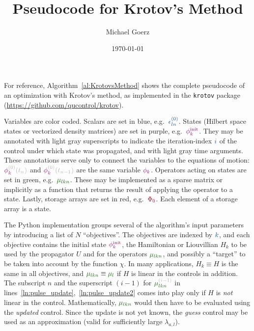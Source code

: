 \documentclass[aps,pra,twocolumn,notitlepage,letterpaper]{revtex4}
\def\Author{Michael Goerz}
\def\Title{Pseudocode for Krotov's Method}
\newcommand{\VarScalar}[1]{{\color{clVarScalar}#1}}
\newcommand{\VarState}[1]{\ensuremath{\textcolor{clVarState}{#1}}}
\newcommand{\PropAnnotation}[1]{\textcolor{black!30}{#1}}
\newcommand{\VarPropState}[4]{\ensuremath{\VarState{#1}_{\textcolor{clVarState}{#2}}^{\PropAnnotation{#3}}\PropAnnotation{(#4)}}}  %
\newcommand{\VarOperator}[2]{{\color{clVarOperator}#1_{#2}}} %
\newcommand{\VarArray}[1]{{\color{clVarArray}#1}}
\begin{document}
\title{\Title}
\author{\Author}
\date{\today}

\maketitle

For reference, Algorithm~\ref{al:KrotovsMethod} shows the complete pseudocode of
an optimization with Krotov's method, as implemented in the
\texttt{krotov} package (\url{https://github.com/qucontrol/krotov}).

Variables are color coded.
Scalars are set in blue, e.g.\ $\VarScalar{\epsilon_{ln}^{(0)}}$.
States  (Hilbert space states or vectorized density matrices) are set in purple,
e.g.\ $\VarState{\phi_k^{\text{init}}}$.
They may be annotated with light gray superscripts to indicate the
iteration-index $\VarScalar{i}$ of the control under which state was propagated,
and with light gray time arguments.
These annotations serve only to connect the variables to the equations of
motion: $\VarPropState{\phi}{k}{(0)}{t_n}$ and
$\VarPropState{\phi}{k}{(0)}{t_{n-1}}$ are the same variable
$\VarState{\phi_k}$.
Operators acting on states are set in green, e.g.\ $\VarOperator{\mu}{lkn}$.
These may be implemented as a sparse matrix or implicitly as a function that
returns the result of applying the operator to a state.
Lastly, storage arrays are set in red, e.g.\ $\VarArray{\Phi_0}$.
Each element of a storage array is a state.

The Python implementation groups several of the algorithm's input parameters by
introducing a list of $N$ ``objectives''.
The objectives are indexed by $\VarScalar{k}$, and each objective contains the
initial state $\VarState{\phi_k^{\text{init}}}$, the Hamiltonian or Liouvillian
$H_k$ to be used by the propagator $U$ and for the operators
$\VarOperator{\mu}{lkn}$, and possibly a ``target'' to be taken into account by
the function $\chi$.
In many applications, $H_k \equiv H$ is the same in all objectives, and
$\VarOperator{\mu}{lkn} \equiv \VarOperator{\mu}{l}$ if $H$ is linear in the
controls in addition.
The subscript $n$ and the superscript $(i-1)$ for
$\VarOperator{\mu^{\PropAnnotation{(i-1)}}}{lkn}$ in
lines~\ref{ln:pulse_update},~\ref{ln:pulse_update2} comes into play only if $H$
is \emph{not} linear in the control.
Mathematically, $\VarOperator{\mu}{lkn}$ would then have to be evaluated using
the \emph{updated} control.
Since the update is not yet known, the \emph{guess} control may be used as an
approximation (valid for sufficiently large $\lambda_{a,l}$).
\end{document}
